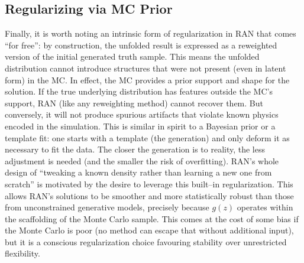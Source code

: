 {{        \subsection{Regularizing via MC Prior}
            Finally, it is worth noting an intrinsic form of regularization in RAN that comes “for free”: by construction, the unfolded result is expressed as a reweighted version of the initial generated truth sample.
            This means the unfolded distribution cannot introduce structures that were not present (even in latent form) in the MC.
            In effect, the MC provides a prior support and shape for the solution.
            If the true underlying distribution has features outside the MC’s support, RAN (like any reweighting method) cannot recover them.
            But conversely, it will not produce spurious artifacts that violate known physics encoded in the simulation.
            This is similar in spirit to a Bayesian prior or a template fit: one starts with a template (the generation) and only deform it as necessary to fit the data.
            The closer the generation is to reality, the less adjustment is needed (and the smaller the risk of overfitting).
            RAN’s whole design of “tweaking a known density rather than learning a new one from scratch” is motivated by the desire to leverage this built--in regularization.
            This allows RAN’s solutions to be smoother and more statistically robust than those from unconstrained generative models, precisely because $g(z)$ operates within the scaffolding of the Monte Carlo sample.
            This comes at the cost of some bias if the Monte Carlo is poor (no method can escape that without additional input), but it is a conscious regularization choice favouring stability over unrestricted flexibility.

}}
